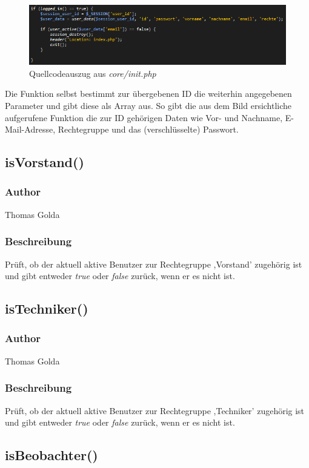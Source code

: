 \documentclass[fontsize = 12pt, paper = a4]{scrreprt}
\begin{document}
\begin{figure}[h]
\centering
\includegraphics[scale = 0.78]{userdata.png}
\caption[user\_data() Funktion]{Quellcodeauszug aus \textit{core/init.php}}
\label{Quellcodeauszug aus core/init.php}
\end{figure}

Die Funktion selbst bestimmt zur übergebenen ID die weiterhin angegebenen Parameter und gibt diese als Array aus. So gibt die aus dem Bild ersichtliche aufgerufene Funktion die zur ID gehörigen Daten wie Vor- und Nachname, E-Mail-Adresse, Rechtegruppe und das (verschlüsselte) Passwort.


\subsection*{isVorstand()}
\subsubsection*{Author}
Thomas Golda
\subsubsection*{Beschreibung}
Prüft, ob der aktuell aktive Benutzer zur Rechtegruppe ,Vorstand' zugehörig ist und gibt entweder \textit{true} oder \textit{false} zurück, wenn er es nicht ist.


\subsection*{isTechniker()}
\subsubsection*{Author}
Thomas Golda
\subsubsection*{Beschreibung}
Prüft, ob der aktuell aktive Benutzer zur Rechtegruppe ,Techniker' zugehörig ist und gibt entweder \textit{true} oder \textit{false} zurück, wenn er es nicht ist.


\subsection*{isBeobachter()}
\end{document}
